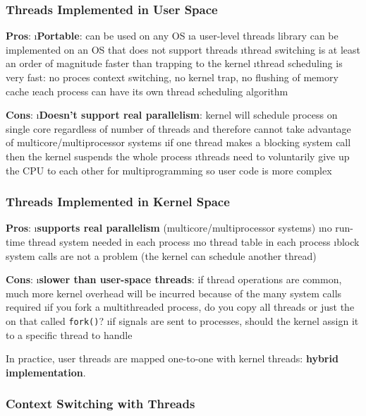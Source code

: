 \documentclass{article}
\begin{document}
    \subsubsection{Threads Implemented in User Space}

    \textbf{Pros}:
    \bl
    \i \textbf{Portable}: can be used on any OS
    \i a user-level threads library can be implemented on an OS that does not support threads
    \i thread switching is at least an order of magnitude faster than trapping to the kernel
    \i thread scheduling is very fast: no proces context switching, no kernel trap, no flushing of memory cache
    \i each process can have its own thread scheduling algorithm
    \el

    \noindent \textbf{Cons}:
    \bl
    \i \textbf{Doesn't support real parallelism}: kernel will schedule process on single core regardless of number of threads and therefore cannot take advantage of multicore/multiprocessor systems
    \i if one thread makes a blocking system call then the kernel suspends the whole process
    \i threads need to voluntarily give up the CPU to each other for multiprogramming so user code is more complex
    \el

    \subsubsection{Threads Implemented in Kernel Space}

    \textbf{Pros}:
    \bl
    \i \textbf{supports real parallelism} (multicore/multiprocessor systems)
    \i no run-time thread system needed in each process
    \i no thread table in each process
    \i block system calls are not a problem (the kernel can schedule another thread)
    \el

    \noindent \textbf{Cons}:
    \bl
    \i \textbf{slower than user-space threads}: if thread operations are common, much more kernel overhead will be incurred because of the many system calls required
    \i if you fork a multithreaded process, do you copy all threads or just the on that called \texttt{fork()}?
    \i if signals are sent to processes, should the kernel assign it to a specific thread to handle
    \el

    \noindent In practice, user threads are mapped one-to-one with kernel threads: \textbf{hybrid implementation}. 

    \subsubsection{Context Switching with Threads}
\end{document}
